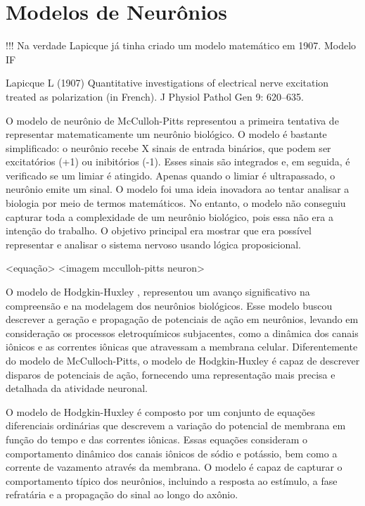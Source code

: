 \section{Modelos de Neurônios}

!!! Na verdade Lapicque já tinha criado um modelo matemático em 1907. Modelo IF

Lapicque L (1907) Quantitative investigations of electrical
nerve excitation treated as polarization (in French). J
Physiol Pathol Gen 9: 620–635.

O modelo de neurônio de McCulloh-Pitts \cite{mccullochLogical1943} representou a primeira tentativa de representar matematicamente
um neurônio biológico. O modelo é bastante simplificado: o neurônio recebe X sinais de entrada binários, que podem ser
excitatórios (+1) ou inibitórios (-1). Esses sinais são integrados e, em seguida, é verificado se um limiar é atingido. Apenas
quando o limiar é ultrapassado, o neurônio emite um sinal. O modelo foi uma ideia inovadora ao tentar analisar a biologia por meio
de termos matemáticos. No entanto, o modelo não conseguiu capturar toda a complexidade de um neurônio biológico, pois essa não era
a intenção do trabalho. O objetivo principal era mostrar que era possível representar e analisar o sistema nervoso usando lógica
proposicional.

<equação>
<imagem mcculloh-pitts neuron>

O modelo de Hodgkin-Huxley \cite{hodgkinQuantitative1952}, representou um avanço significativo na compreensão e na modelagem dos
neurônios biológicos. Esse modelo buscou descrever a geração e propagação de potenciais de ação em neurônios, levando em
consideração os processos eletroquímicos subjacentes, como a dinâmica dos canais iônicos e as correntes iônicas que atravessam a
membrana celular. Diferentemente do modelo de McCulloch-Pitts, o modelo de Hodgkin-Huxley é capaz de descrever disparos de
potenciais de ação, fornecendo uma representação mais precisa e detalhada da atividade neuronal.

O modelo de Hodgkin-Huxley é composto por um conjunto de equações diferenciais ordinárias que descrevem a variação do potencial de
membrana em função do tempo e das correntes iônicas. Essas equações consideram o comportamento dinâmico dos canais iônicos de
sódio e potássio, bem como a corrente de vazamento através da membrana. O modelo é capaz de capturar o comportamento típico dos
neurônios, incluindo a resposta ao estímulo, a fase refratária e a propagação do sinal ao longo do axônio.


